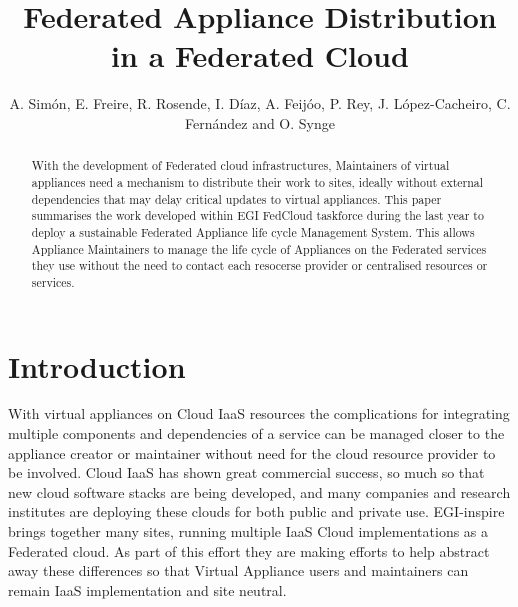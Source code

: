 \documentclass{llncs_Ibergrid2013}
\begin{document}
%
\frontmatter          %
%
\pagestyle{headings}  %
%
\mainmatter              %
%
\title{Federated Appliance Distribution in a Federated Cloud}
%
%
\author{A. Sim\'on, E. Freire, R. Rosende, I. D\'iaz, A. Feij\'oo, P. Rey, J. L\'opez-Cacheiro, C. Fern\'andez and O. Synge}
%
%
%




\maketitle              %

\begin{abstract}
With the development of Federated cloud infrastructures, Maintainers of virtual appliances need a mechanism to distribute their work to sites, ideally without external dependencies that may delay critical updates to virtual appliances. This paper summarises the work developed within EGI FedCloud taskforce during the last year to deploy a sustainable Federated Appliance life cycle Management System. This allows Appliance Maintainers to manage the life cycle of Appliances on the Federated services they use without the need to contact each resocerse provider or centralised resources or services.
\end{abstract}

%
\section{Introduction}
\label{sect-introduction}
%
With virtual appliances on Cloud IaaS resources the complications for integrating multiple components and dependencies of a service can be managed closer to the appliance creator or maintainer without need for the cloud resource provider to be involved. Cloud IaaS has shown great commercial success, so much so that new cloud software stacks are being developed, and many companies and research institutes are deploying these clouds for both public and private use. EGI-inspire brings together many sites, running multiple IaaS Cloud implementations as a Federated cloud. As part of this effort they are making efforts to help abstract away these differences so that Virtual Appliance users and maintainers can remain IaaS implementation and site neutral.
\end{document}
